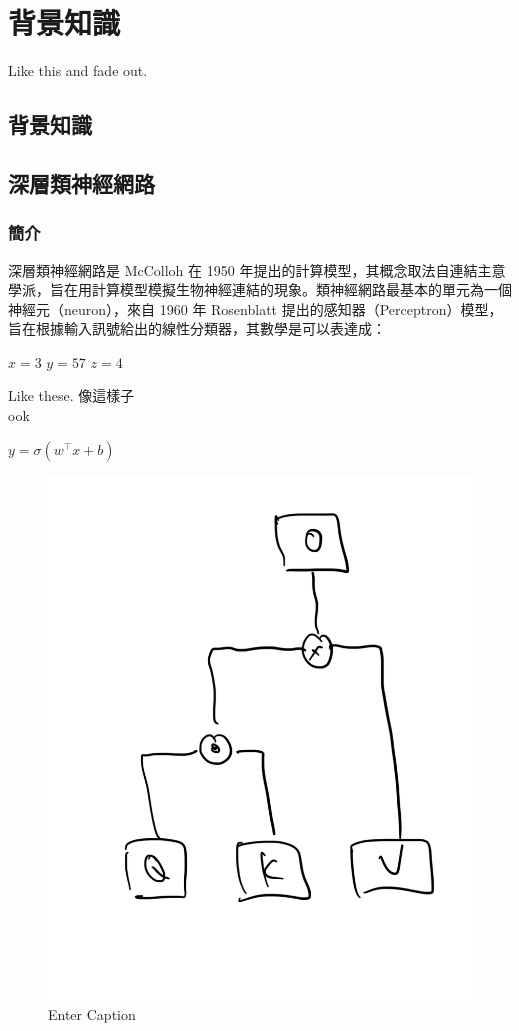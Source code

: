 \chapter{背景知識}
Like this \cite{726791, baevski2020wav2vec} and fade out.

\section{背景知識}

\section{深層類神經網路}

\subsection{簡介}

深層類神經網路是 McColloh 在 1950 年提出的計算模型，其概念取法自連結主意學派，旨在用計算模型模擬生物神經連結的現象。類神經網路最基本的單元為一個神經元（neuron），來自 1960 年 Rosenblatt 提出的感知器（Perceptron）模型，旨在根據輸入訊號給出的線性分類器，其數學是可以表達成：

$ x = 3 $
\( y = 57 \)
\( z = 4 \)

Like these. 像這樣子 \\
ook

$y=\sigma(w^\top x + b) $

\begin{figure}
    \centering
    \includegraphics[width=0.5\linewidth]{figures/Yy.png}
    \caption{Enter Caption}
    \label{fig:enter-label}
\end{figure}

